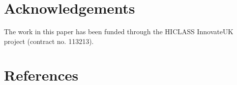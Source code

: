 \documentclass[preprint,12pt, a4paper]{elsarticle}
\begin{document}
\section*{Acknowledgements}
\label{}
The work in this paper has been funded through the HICLASS InnovateUK project (contract no. 113213).

\section*{References}


  
  


%
%
%
\end{document}
